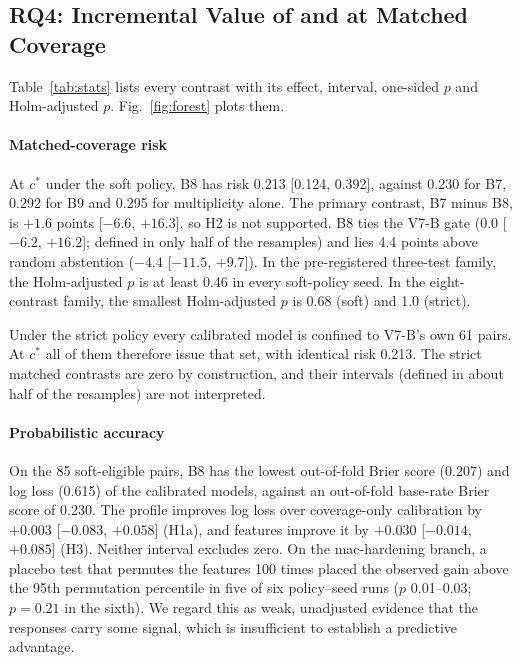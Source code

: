 \subsection{RQ4: Incremental Value of \cec{} and \ers{} at Matched Coverage}\label{sec:res-rq4}
Table~\ref{tab:stats} lists every contrast with its effect, interval, one-sided $p$ and Holm-adjusted $p$. Fig.~\ref{fig:forest} plots them.

\paragraph*{Matched-coverage risk} At $c^\ast$ under the soft policy, B8 has risk 0.213 [0.124, 0.392], against 0.230 for B7, 0.292 for B9 and 0.295 for multiplicity alone. The primary contrast, B7 minus B8, is $+1.6$ points [$-6.6$, $+16.3$], so H2 is not supported. B8 ties the V7-B gate (0.0 [$-6.2$, $+16.2$]; defined in only half of the resamples) and lies 4.4 points above random abstention ($-4.4$ [$-11.5$, $+9.7$]). In the pre-registered three-test family, the Holm-adjusted $p$ is at least 0.46 in every soft-policy seed. In the eight-contrast family, the smallest Holm-adjusted $p$ is 0.68 (soft) and 1.0 (strict).

Under the strict policy every calibrated model is confined to V7-B's own 61 \NDO{} pairs. At $c^\ast$ all of them therefore issue that set, with identical risk 0.213. The strict matched contrasts are zero by construction, and their intervals (defined in about half of the resamples) are not interpreted.

\paragraph*{Probabilistic accuracy} On the 85 soft-eligible pairs, B8 has the lowest out-of-fold Brier score (0.207) and log loss (0.615) of the calibrated models, against an out-of-fold base-rate Brier score of 0.230. The profile improves log loss over coverage-only calibration by $+0.003$ [$-0.083$, $+0.058$] (H1a), and \ers{} features improve it by $+0.030$ [$-0.014$, $+0.085$] (H3). Neither interval excludes zero. On the mac-hardening branch, a placebo test that permutes the \ers{} features 100 times placed the observed gain above the 95th permutation percentile in five of six policy--seed runs ($p$ 0.01--0.03; $p=0.21$ in the sixth). We regard this as weak, unadjusted evidence that the responses carry some signal, which is insufficient to establish a predictive advantage.

